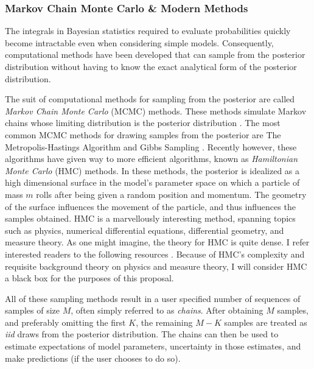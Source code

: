 \subsubsection{Markov Chain Monte Carlo \& Modern Methods}

The integrals in Bayesian statistics required to evaluate probabilities quickly become intractable even when considering simple models.  Consequently, computational methods have been developed that can sample from the posterior distribution without having to know the exact analytical form of the posterior distribution.

The suit of computational methods for sampling from the posterior are called \textit{Markov Chain Monte Carlo} (MCMC) methods.  These methods simulate Markov chains whose limiting distribution is the posterior distribution \cite{livingstone2016geometric}.  The most common MCMC methods for drawing  samples from the posterior are The Metropolis-Hastings Algorithm and Gibbs Sampling \cite{gelman2013bayesian,mcelreath2016statistical}.  Recently however, these algorithms have given way to more efficient algorithms, known as \textit{Hamiltonian Monte Carlo} (HMC) methods.  In these methods, the posterior is idealized as a high dimensional surface in the model's parameter space on which a particle of mass $ m $ rolls after being given a random position and momentum.  The geometry of the surface influences the movement of the particle, and thus influences the samples obtained.  HMC is a marvellously interesting method, spanning topics such as physics, numerical differential equations, differential geometry, and measure theory.  As one might imagine, the theory for HMC is quite dense.  I refer interested readers to the following resources \cite{ gelman2013bayesian, livingstone2016geometric, mcelreath2016statistical,neal2011mcmc, hoffman2014no,betancourt2017conceptual}.  Because of HMC's complexity and requisite background theory on physics and measure theory, I will consider HMC a black box for the purposes of this proposal.

All of these sampling methods result in a user specified number of sequences of samples of size $ M$, often simply referred to as \textit{chains}. After obtaining $ M $ samples, and preferably omitting the first $ K $, the remaining $ M-K $ samples are treated as \textit{iid} draws from the posterior distribution.  The chains can then be used to estimate expectations of model parameters, uncertainty in those estimates, and make predictions (if the user chooses to do so).

